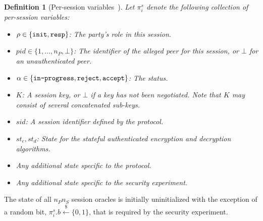 \documentclass[USenglish,oneside,twocolumn]{article}
\theoremstyle{dgthm}
\theoremstyle{dgdef}
\newtheorem{definition}[theorem]{Definition}
\newcommand{\samples}{\xleftarrow{\$}}
\newcommand{\p}[2]{\pi_{#1}^{#2}}
\newcommand{\Token}[1]{\textnormal{\tt{#1}}}
\newcommand{\init}{\Token{init}}
\newcommand{\resp}{\Token{resp}}
\newcommand{\inprog}{\Token{in-progress}}
\newcommand{\reject}{\Token{reject}}
\newcommand{\accept}{\Token{accept}}
\begin{document}
    \pagebreak
    \begin{definition}[Per-session variables~\cite{Bergsma2014}]
      Let $\p{i}{s}$ denote the following collection of \emph{per-session} variables:
      \begin{itemize}
        \item $\rho \in \{\init, \resp\}$: The party's role in this session.
        \item $pid \in \{1, \dots, n_P, \bot\}$: The identifier of the alleged peer for this session, or $\bot$ for an unauthenticated peer.
        \item $\alpha \in \{\inprog, \reject, \accept\}$: The status.
        \item $K$: A session key, or $\bot$ if a key has not been negotiated.
          Note that $K$ may consist of several concatenated sub-keys.
        \item $sid$: A session identifier defined by the protocol.
        \item $st_e, st_d$: State for the stateful authenticated encryption and decryption algorithms.
        \item Any additional state specific to the protocol.
        \item Any additional state specific to the security experiment.
      \end{itemize}
    \end{definition}

    The state of all $n_Pn_S$ session oracles is initially uninitialized with
    the exception of a random bit, $\p{i}{s}.b \samples \{0,1\}$, that is
    required by the security experiment.
\end{document}
